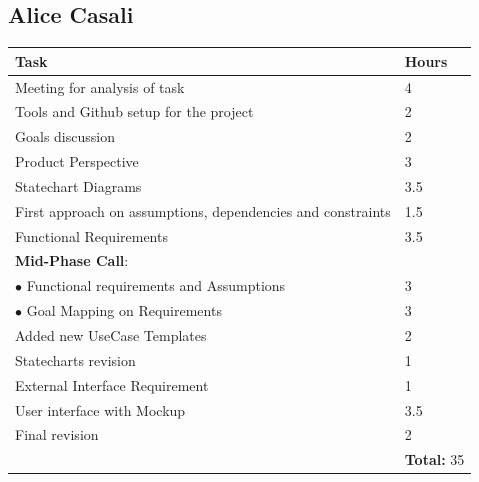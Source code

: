 \documentclass{report}
\begin{document}
\subsection*{Alice Casali}
\begin{table}[!ht]
	\begin{tabular}{|C{.60\textwidth}||C{.20\textwidth}|}
		\toprule
		\textbf{Task} & \textbf{Hours}\\
		\midrule
		\midrule
		Meeting for analysis of task & 4\\
		\midrule
		Tools and Github setup for the project & 2\\
		\midrule
		Goals discussion & 2\\
		\midrule
		Product Perspective & 3\\ 
		\midrule
		Statechart Diagrams & 3.5\\
		\midrule
		First approach on assumptions, dependencies and constraints & 1.5\\
		\midrule
		Functional Requirements & 3.5\\ 
		\midrule
		\small{\textbf{Mid-Phase Call}}: & \\
		\vspace{.2mm}
		$\bullet$ Functional requirements and Assumptions & \vspace{.2mm} 3\\
		$\bullet$ Goal Mapping on Requirements & 3\\
		\midrule
		Added new UseCase Templates & 2 \\
		\midrule
		Statecharts revision & 1\\
		\midrule
		External Interface Requirement & 1\\
		\midrule
		User interface with Mockup & 3.5\\
		\midrule
		Final revision & 2\\
		\midrule
		& \textbf{Total:} 35\\
		\bottomrule
	\end{tabular}
\end{table}
\end{document}
